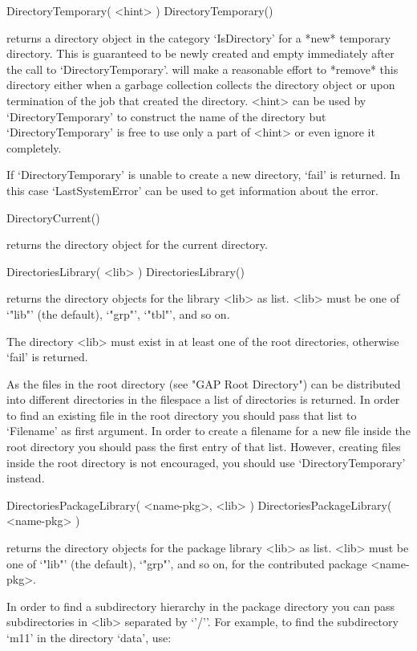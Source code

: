 \>DirectoryTemporary( <hint> )
\)DirectoryTemporary()

returns  a directory  object in the   category `IsDirectory' for a  *new*
temporary directory.   This is guaranteed to  be  newly created and empty
immediately  after the call to `DirectoryTemporary'.   {\GAP} will make a
reasonable effort   to *remove* this   directory  either  when a  garbage
collection  collects the directory   object  or upon termination  of  the
{\GAP}   job that   created  the  directory.     <hint> can  be  used  by
`DirectoryTemporary' to construct    the  name  of the    directory   but
`DirectoryTemporary' is free to use only a  part of <hint> or even ignore
it completely.

If `DirectoryTemporary' is  unable to create a  new  directory, `fail' is
returned.  In this case `LastSystemError' can be  used to get information
about the error.

\>DirectoryCurrent()

returns the directory object for the current directory.

\>DirectoriesLibrary( <lib> )
\)DirectoriesLibrary()

returns the  directory objects  for  the  {\GAP}  library <lib>  as list.
<lib> must be one of `"lib"' (the default), `"grp"', `"tbl"', and so on.

The directory <lib> must exist in at  least one of the root directories,
otherwise `fail' is returned.

As the files in the {\GAP} root  directory (see "GAP Root Directory") can
be  distributed  into different  directories in the  filespace  a list of
directories is returned.  In order to find an existing file in the {\GAP}
root directory you should pass that list to `Filename' as first argument.
In order to  create  a filename  for a  new file inside the  {\GAP}  root
directory you   should pass  the first  entry    of that list.   However,
creating files  inside the {\GAP} root  directory is not  encouraged, you
should use `DirectoryTemporary' instead.

\>DirectoriesPackageLibrary( <name-pkg>, <lib> )
\)DirectoriesPackageLibrary( <name-pkg> )

returns  the   directory objects  for   the   package library   <lib>  as
list. <lib> must be one of `"lib"' (the default), `"grp"', and so on, for
the contributed package <name-pkg>.

In order to  find a subdirectory hierarchy in  the package  directory you
can  pass subdirectories in <lib> separated  by `{'/'}'.  For example, to
find the subdirectory `m11' in the directory `data', use:

